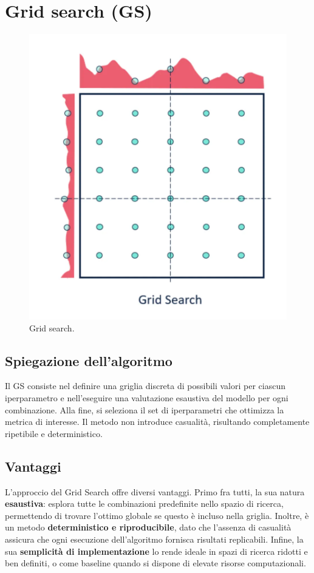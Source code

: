\documentclass[a4paper,12pt]{report}
\begin{document}
	\section{Grid search (GS)}
	\begin{figure}[H]
		\centering
		\includegraphics[width=1.0\textwidth]{img/gs.png}
		\caption{Grid search.}
	\end{figure}
	\subsection{Spiegazione dell'algoritmo}
	Il GS consiste nel definire una griglia discreta di possibili valori per ciascun iperparametro e nell'eseguire una valutazione esaustiva del modello per ogni combinazione. Alla fine, si seleziona il set di iperparametri che ottimizza la metrica di interesse. Il metodo non introduce casualità, risultando completamente ripetibile e deterministico.
	
	\subsection{Vantaggi}
	L'approccio del Grid Search offre diversi vantaggi. Primo fra tutti, la sua natura \textbf{esaustiva}: esplora tutte le combinazioni predefinite nello spazio di ricerca, permettendo di trovare l'ottimo globale se questo è incluso nella griglia. Inoltre, è un metodo \textbf{deterministico e riproducibile}, dato che l'assenza di casualità assicura che ogni esecuzione dell'algoritmo fornisca risultati replicabili. Infine, la sua \textbf{semplicità di implementazione} lo rende ideale in spazi di ricerca ridotti e ben definiti, o come baseline quando si dispone di elevate risorse computazionali.
	
\end{document}
